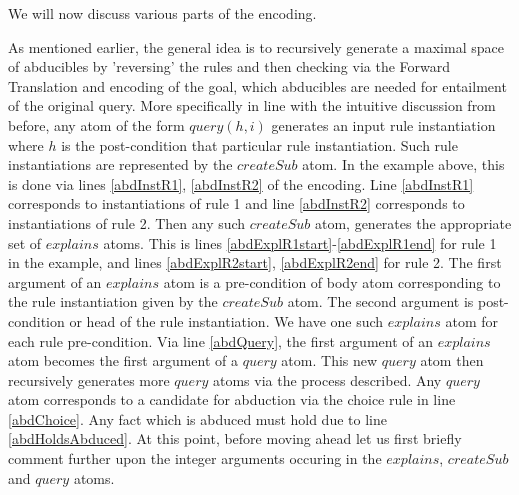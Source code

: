 We will now discuss various parts of the encoding.

As mentioned earlier, the general idea is to recursively generate a
maximal space of abducibles by 'reversing' the rules and then checking via the
Forward Translation and encoding of the goal, which abducibles are needed
for entailment of the original query.  
More specifically in line with the intuitive discussion from before, any atom
of the form $query(h,i)$ generates an input rule instantiation where $h$ is
the post-condition that particular rule instantiation. Such rule
instantiations are represented by the $createSub$ atom. In the example above,
this is done via lines \ref{abdInstR1}, \ref{abdInstR2} of the encoding. Line \ref{abdInstR1} corresponds to
instantiations of rule 1 and line \ref{abdInstR2} corresponds to instantiations of rule
2. Then any such $createSub$ atom, generates the appropriate set of $explains$
atoms. This is lines \ref{abdExplR1start}-\ref{abdExplR1end} for rule 1 in the example, and lines \ref{abdExplR2start}, \ref{abdExplR2end} for
rule 2. The first argument of an $explains$ atom is a pre-condition of body
atom corresponding to the rule instantiation given by the $createSub$
atom. The second argument is post-condition or head of the rule
instantiation. We have one such $explains$ atom for each rule
pre-condition. Via line \ref{abdQuery}, the first argument of an $explains$ atom becomes
the first argument of a $query$ atom. This new $query$ atom then recursively
generates more $query$ atoms via the process described. Any $query$ atom
corresponds to a candidate for abduction via the choice rule in line \ref{abdChoice}. Any
fact which is abduced must hold due to line \ref{abdHoldsAbduced}. At this point, before moving
ahead let us first briefly comment further upon the integer arguments occuring in the
$explains$, $createSub$ and $query$ atoms.

